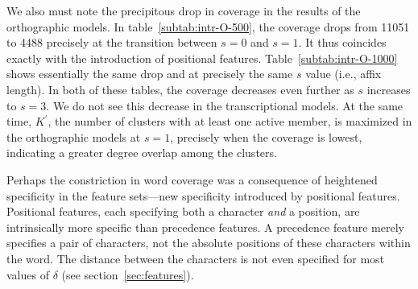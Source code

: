 {We also must note the precipitous drop in coverage in the results of the orthographic models. In table~\ref{subtab:intr-O-500}, the coverage drops from 11051 to 4488 precisely at the transition between $s=0$ and $s=1$. It thus coincides exactly with the introduction of positional features. Table~\ref{subtab:intr-O-1000} shows essentially the same drop and at precisely the same $s$ value (i.e., affix length).  In both of these tables, the coverage decreases even further as $s$ increases to $s=3$.  %
We do not see this decrease in the transcriptional models. %
At the same time, $K^{\prime}$, the number of clusters with at least one active member, is maximized in the orthographic models at $s = 1$, precisely when the coverage is lowest, indicating a greater degree overlap among the clusters. 

Perhaps the constriction in word coverage was a consequence of heightened specificity in the feature sets---new specificity introduced by positional features.
Positional features, each specifying both a character \emph{and} a position, are intrinsically more specific than precedence features. A precedence feature merely specifies a pair of characters, not the absolute positions of these characters within the word. The distance between the characters is not even specified for most values of $\delta$ (see section~\ref{sec:features}).

}
